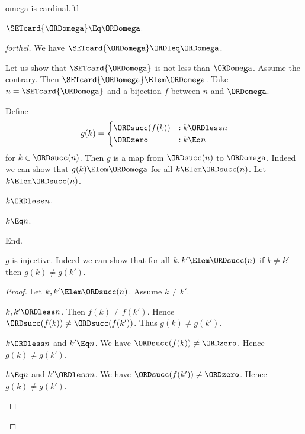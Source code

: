 \documentclass{stex}
\begin{document}
\begin{smodule}{omega-is-cardinal.ftl}

\begin{proposition}[forthel]
  $\SETcard{\ORDomega} \Eq \ORDomega$.
\end{proposition}
\begin{proof}[forthel]
  We have $\SETcard{\ORDomega} \ORDleq \ORDomega$.

  Let us show that $\SETcard{\ORDomega}$ is not less than $\ORDomega$.
    Assume the contrary.
    Then $\SETcard{\ORDomega} \Elem \ORDomega$.
    Take $n = \SETcard{\ORDomega}$ and a bijection $f$ between $n$ and $\ORDomega$.

    Define \[ g(k) =
      \begin{cases}
        \ORDsucc(f(k)) & : k \ORDless n
        \\
        \ORDzero           & : k \Eq n
      \end{cases} \]
    for $k \in \ORDsucc(n)$.
    Then $g$ is a map from $\ORDsucc(n)$ to $\ORDomega$.
    Indeed we can show that $g(k) \Elem \ORDomega$ for all $k \Elem \ORDsucc(n)$.
      Let $k \Elem \ORDsucc(n)$.
      \begin{case}{$k \ORDless n$.} \end{case}
      \begin{case}{$k \Eq n$.} \end{case}
    End.

    $g$ is injective.
    Indeed we can show that for all $k, k' \Elem \ORDsucc(n)$ if $k \neq k'$
    then $g(k) \neq g(k')$. 
    \begin{proof}
      Let $k, k' \Elem \ORDsucc(n)$.
      Assume $k \neq k'$.

      \begin{case}{$k, k' \ORDless n$.}
        Then $f(k) \neq f(k')$.
        Hence $\ORDsucc(f(k)) \neq \ORDsucc(f(k'))$.
        Thus $g(k) \neq g(k')$.
      \end{case}

      \begin{case}{$k \ORDless n$ and $k' \Eq n$.}
        We have $\ORDsucc(f(k)) \neq \ORDzero$.
        Hence $g(k) \neq g(k')$.
      \end{case}

      \begin{case}{$k \Eq n$ and $k' \ORDless n$.}
        We have $\ORDsucc(f(k')) \neq \ORDzero$.
        Hence $g(k) \neq g(k')$.
      \end{case}
    \end{proof}


\end{proof}
\end{smodule}
\end{document}
